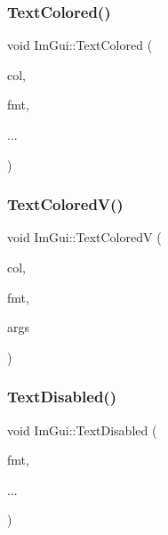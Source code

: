 \subsubsection{\texorpdfstring{Text\+Colored()}{TextColored()}}
{\footnotesize\ttfamily void Im\+Gui\+::\+Text\+Colored (\begin{DoxyParamCaption}\item[{const \hyperlink{struct_im_vec4}{Im\+Vec4} \&}]{col,  }\item[{const char $\ast$}]{fmt,  }\item[{}]{... }\end{DoxyParamCaption})}

\hypertarget{namespace_im_gui_a87c24ece994188a7145d8feecb4439ed}{}\label{namespace_im_gui_a87c24ece994188a7145d8feecb4439ed} 
\subsubsection{\texorpdfstring{Text\+Colored\+V()}{TextColoredV()}}
{\footnotesize\ttfamily void Im\+Gui\+::\+Text\+ColoredV (\begin{DoxyParamCaption}\item[{const \hyperlink{struct_im_vec4}{Im\+Vec4} \&}]{col,  }\item[{const char $\ast$}]{fmt,  }\item[{va\+\_\+list}]{args }\end{DoxyParamCaption})}

\hypertarget{namespace_im_gui_aa96bf14c5fa288e106820aeb4ba7fcb6}{}\label{namespace_im_gui_aa96bf14c5fa288e106820aeb4ba7fcb6} 
\subsubsection{\texorpdfstring{Text\+Disabled()}{TextDisabled()}}
{\footnotesize\ttfamily void Im\+Gui\+::\+Text\+Disabled (\begin{DoxyParamCaption}\item[{const char $\ast$}]{fmt,  }\item[{}]{... }\end{DoxyParamCaption})}

\hypertarget{namespace_im_gui_a5b128d4f12d7e33e95fb9cef7dce027e}{}\label{namespace_im_gui_a5b128d4f12d7e33e95fb9cef7dce027e} 
